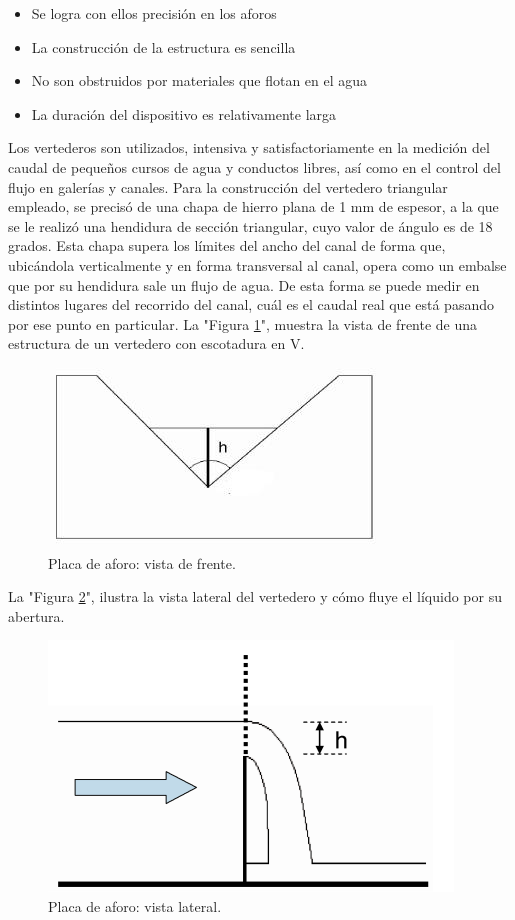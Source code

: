 \begin{itemize}
\item Se logra con ellos precisión en los aforos 	
\item La construcción de la estructura es sencilla
\item No son obstruidos por materiales que flotan en el agua 
\item La duración del dispositivo es relativamente larga
\end{itemize}
Los vertederos son utilizados, intensiva y satisfactoriamente en la medición del caudal de pequeños cursos de agua y conductos libres, así como en el control del flujo en galerías y canales.
Para la construcción del vertedero triangular empleado, se precisó de una chapa de hierro plana de 1 mm de espesor, a la que se le  realizó una hendidura de sección triangular, cuyo  valor de ángulo es de 18 grados.
Esta chapa supera los límites del ancho del canal de forma que, ubicándola  verticalmente y en forma transversal al canal, opera como un embalse que por su hendidura sale un flujo de agua.
De esta forma se puede medir en distintos lugares del recorrido del canal, cuál es el caudal real que está pasando por ese punto en particular.  
La "Figura \ref{fig:Placa de aforo}",  muestra la vista de frente de una estructura de un vertedero con escotadura en V. 	

\begin{figure}[htpb]
\centering
\includegraphics[scale=.85]{./Figures/PlacaDeAforo.jpeg}
\caption{Placa de aforo: vista de frente.}
\label{fig:Placa de aforo}
\end{figure}

La "Figura \ref{fig:Placa de aforo-VistaLateral}", ilustra la vista lateral del vertedero y cómo fluye el líquido por su abertura.

\begin{figure}[htpb]
\centering
\includegraphics[scale=.85]{./Figures/PlacaDeAforo-VistaLateral.png}
\caption{Placa de aforo: vista lateral.}
\label{fig:Placa de aforo-VistaLateral}
\end{figure}

